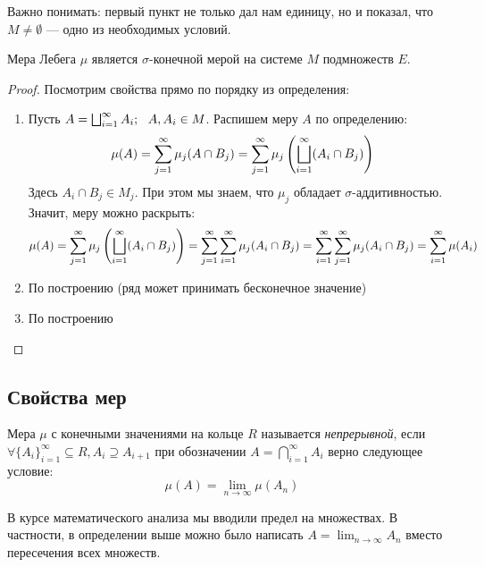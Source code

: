 \begin{note}
	Важно понимать: первый пункт не только дал нам единицу, но и показал, что $M \neq \emptyset$ --- одно из необходимых условий.
\end{note}

\begin{theorem}
	Мера Лебега $\mu$ является $\sigma$-конечной мерой на системе $M$ подмножеств $E$.
\end{theorem}

\begin{proof}
	Посмотрим свойства прямо по порядку из определения:
	\begin{enumerate}
		\item Пусть $A = \bscup_{i = 1}^\infty A_i;\ \ A, A_i \in M$. Распишем меру $A$ по определению:
		\[
			\mu(A) = \sum_{j = 1}^\infty \mu_j(A \cap B_j) = \sum_{j = 1}^\infty \mu_j\left(\bigsqcup_{i = 1}^\infty (A_i \cap B_j)\right)
		\]
		Здесь $A_i \cap B_j \in M_j$. При этом мы знаем, что $\mu_j$ обладает $\sigma$-аддитивностью. Значит, меру можно раскрыть:
		\[
			\mu(A) = \sum_{j = 1}^\infty \mu_j\left(\bigsqcup_{i = 1}^\infty (A_i \cap B_j)\right) = \sum_{j = 1}^\infty \sum_{i = 1}^\infty \mu_j(A_i \cap B_j) = \sum_{i = 1}^\infty \sum_{j = 1}^\infty \mu_j(A_i \cap B_j) = \sum_{i = 1}^\infty \mu(A_i)
		\]
		
		\item По построению (ряд может принимать бесконечное значение)
		
		\item По построению
	\end{enumerate}
\end{proof}

\subsection*{Свойства мер}

\begin{definition}
	Мера $\mu$ с конечными значениями на кольце $R$ называется \textit{непрерывной}, если $\forall \{A_i\}_{i = 1}^\infty \subseteq R, A_i \supseteq A_{i + 1}$ при обозначении $A = \bigcap_{i = 1}^\infty A_i$ верно следующее условие:
	\[
		\mu(A) = \lim_{n \to \infty} \mu(A_n)
	\]
\end{definition}

\begin{note}
	В курсе математического анализа мы вводили предел на множествах. В частности, в определении выше можно было написать $A = \lim_{n \to \infty} A_n$ вместо пересечения всех множеств.
\end{note}

